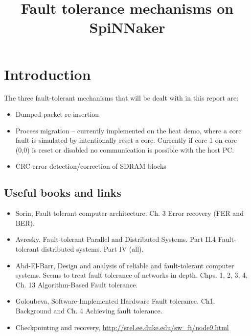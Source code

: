 \documentclass[11pt]{article}
\title{Fault tolerance mechanisms on SpiNNaker}
\begin{document}
\maketitle



\section{Introduction}
The three fault-tolerant mechanisms that will be dealt with in this report are:
\begin{itemize}
\item Dumped packet re-insertion
\item Process migration -- currently implemented on the heat demo, where a core fault is simulated by intentionally reset a core. Currently if core 1 on core (0,0) is reset or disabled no communication is possible with the host PC.
\item CRC error detection/correction of SDRAM blocks
\end{itemize}
	
\subsection{Useful books and links}
\begin{itemize}
\item Sorin, Fault tolerant computer architecture. Ch. 3 Error recovery (FER and BER).
\item Avresky, Fault-tolerant Parallel and Distributed Systems. Part II.4 Fault-tolerant distributed systems. Part IV (all).
\item Abd-El-Barr, Design and analysis of reliable and fault-tolerant computer systems. Seems to treat fault tolerance of networks in depth. Chps. 1, 2, 3, 4, Ch. 13 Algorithm-Based Fault tolerance.
\item Goloubeva, Software-Implemented Hardware Fault tolerance. Ch1. Background and Ch. 4 Achieving fault tolerance.
\item Checkpointing and recovery, \url{http://srel.ee.duke.edu/sw_ft/node9.html}
\end{itemize}
\end{document}
